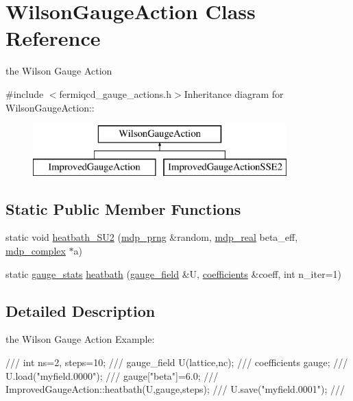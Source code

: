 \hypertarget{class_wilson_gauge_action}{
\section{WilsonGaugeAction Class Reference}
\label{class_wilson_gauge_action}
}


the Wilson Gauge Action  


{\ttfamily \#include $<$fermiqcd\_\-gauge\_\-actions.h$>$}Inheritance diagram for WilsonGaugeAction::\begin{figure}[H]
\begin{center}
\leavevmode
\includegraphics[height=2cm]{class_wilson_gauge_action}
\end{center}
\end{figure}
\subsection*{Static Public Member Functions}
\begin{DoxyCompactItemize}
\item 
static void \hyperlink{class_wilson_gauge_action_a95c910d9c558320e8a55ff04f330d02d}{heatbath\_\-SU2} (\hyperlink{classmdp__prng}{mdp\_\-prng} \&random, \hyperlink{mdp__global__vars_8h_a049e4c1d4e74d644878a42f9909463e4}{mdp\_\-real} beta\_\-eff, \hyperlink{classmdp__complex}{mdp\_\-complex} $\ast$a)
\item 
static \hyperlink{classgauge__stats}{gauge\_\-stats} \hyperlink{class_wilson_gauge_action_a0e5aefe5e3c15f35d0fbcd8e6269b919}{heatbath} (\hyperlink{classgauge__field}{gauge\_\-field} \&U, \hyperlink{classcoefficients}{coefficients} \&coeff, int n\_\-iter=1)
\end{DoxyCompactItemize}


\subsection{Detailed Description}
the Wilson Gauge Action Example: \begin{DoxyVerb}
///    int ns=2, steps=10;
///    gauge_field U(lattice,nc);
///    coefficients gauge;
///    U.load("myfield.0000");
///    gauge["beta"]=6.0;
///    ImprovedGaugeAction::heatbath(U,gauge,steps);
///    U.save("myfield.0001");
/// \end{DoxyVerb}
 

